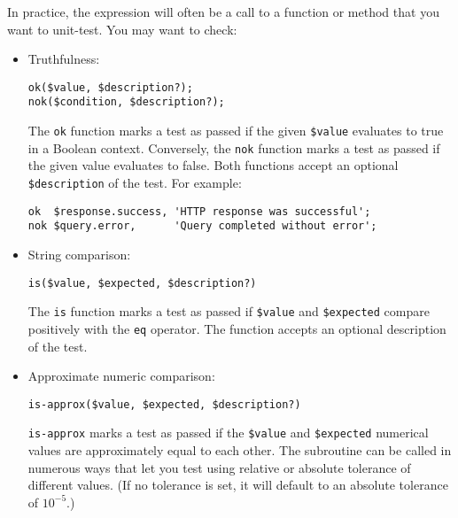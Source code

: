 In practice, the expression will often be a call to a function 
or method that you want to unit-test. You may want to check:

\begin{itemize}
\item Truthfulness: 
\begin{verbatim}
ok($value, $description?); 
nok($condition, $description?);
\end{verbatim}

The {\tt ok} function marks a test as passed if the given 
\verb'$value' evaluates to true in a Boolean context. 
Conversely, the {\tt nok} function marks a test as passed 
if the given value evaluates to false. Both functions 
accept an optional \verb'$description' of the test. 
For example:

\begin{verbatim}
ok  $response.success, 'HTTP response was successful';
nok $query.error,      'Query completed without error';
\end{verbatim}

\item String comparison:
\begin{verbatim}
is($value, $expected, $description?)
\end{verbatim}

The {\tt is} function marks a test as passed if \verb'$value' 
and \verb'$expected' compare positively with the \verb'eq' 
operator. The function accepts an optional description 
of the test.

\item Approximate numeric comparison:

\begin{verbatim}
is-approx($value, $expected, $description?)
\end{verbatim}

{\tt is-approx} marks a test as passed if the \verb'$value' and 
\verb'$expected' numerical values are approximately equal 
to each other. The subroutine can be called in numerous ways 
that let you test using relative or absolute tolerance 
of different values. (If no tolerance is set, it will default 
to an absolute tolerance of $10^{-5}$.)


\end{itemize}

